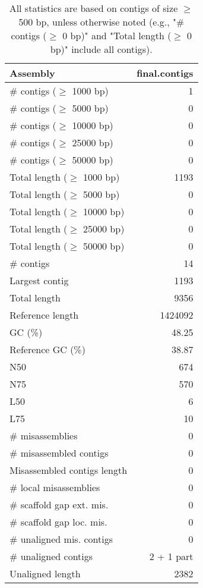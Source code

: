 \documentclass[12pt,a4paper]{article}
\begin{document}
\begin{table}[ht]
\begin{center}
\caption{All statistics are based on contigs of size $\geq$ 500 bp, unless otherwise noted (e.g., "\# contigs ($\geq$ 0 bp)" and "Total length ($\geq$ 0 bp)" include all contigs).}
\begin{tabular}{|l*{1}{|r}|}
\hline
Assembly & final.contigs \\ \hline
\# contigs ($\geq$ 1000 bp) & 1 \\ \hline
\# contigs ($\geq$ 5000 bp) & 0 \\ \hline
\# contigs ($\geq$ 10000 bp) & 0 \\ \hline
\# contigs ($\geq$ 25000 bp) & 0 \\ \hline
\# contigs ($\geq$ 50000 bp) & 0 \\ \hline
Total length ($\geq$ 1000 bp) & 1193 \\ \hline
Total length ($\geq$ 5000 bp) & 0 \\ \hline
Total length ($\geq$ 10000 bp) & 0 \\ \hline
Total length ($\geq$ 25000 bp) & 0 \\ \hline
Total length ($\geq$ 50000 bp) & 0 \\ \hline
\# contigs & 14 \\ \hline
Largest contig & 1193 \\ \hline
Total length & 9356 \\ \hline
Reference length & 1424092 \\ \hline
GC (\%) & 48.25 \\ \hline
Reference GC (\%) & 38.87 \\ \hline
N50 & 674 \\ \hline
N75 & 570 \\ \hline
L50 & 6 \\ \hline
L75 & 10 \\ \hline
\# misassemblies & 0 \\ \hline
\# misassembled contigs & 0 \\ \hline
Misassembled contigs length & 0 \\ \hline
\# local misassemblies & 0 \\ \hline
\# scaffold gap ext. mis. & 0 \\ \hline
\# scaffold gap loc. mis. & 0 \\ \hline
\# unaligned mis. contigs & 0 \\ \hline
\# unaligned contigs & 2 + 1 part \\ \hline
Unaligned length & 2382 \\ \hline

\end{tabular}
\end{center}
\end{table}
\end{document}
